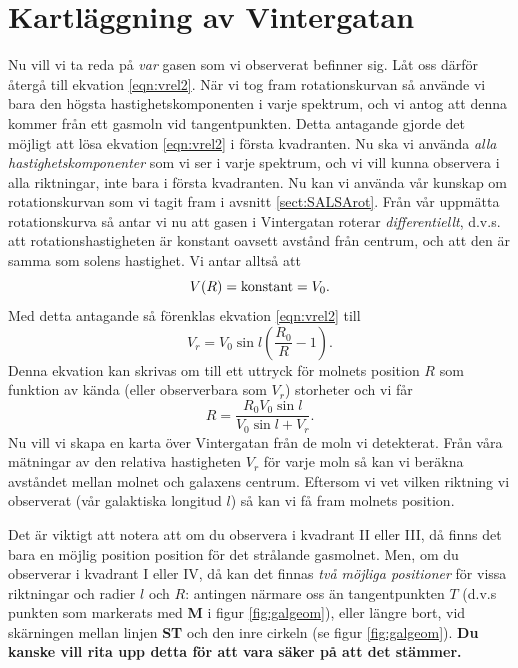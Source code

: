 \section{Kartläggning av Vintergatan}
\label{sect:map}
Nu vill vi ta reda på {\em var} gasen som vi observerat befinner sig.  Låt oss
därför återgå till ekvation \ref{eqn:vrel2}.  När vi tog fram rotationskurvan
så använde vi bara den högsta hastighetskomponenten i varje spektrum, och vi
antog att denna kommer från ett gasmoln vid tangentpunkten.  Detta antagande
gjorde det möjligt att lösa ekvation \ref{eqn:vrel2} i första kvadranten.  Nu
ska vi använda {\em alla hastighetskomponenter} som vi ser i varje spektrum,
och vi vill kunna observera i alla riktningar, inte bara i första kvadranten. 
Nu kan vi använda vår kunskap om rotationskurvan som vi tagit fram i avsnitt \ref{sect:SALSArot}.
Från vår uppmätta rotationskurva så antar vi nu att gasen i Vintergatan 
roterar {\em differentiellt}, d.v.s. att rotationshastigheten är konstant 
oavsett avstånd från centrum, och att den är samma som solens hastighet. Vi 
antar alltså att 
\begin{equation}
	V(R) = {\rm konstant} = V_0.
\end{equation}
Med detta antagande så förenklas ekvation \ref{eqn:vrel2} till 
\begin{equation}
V_r = V_0\sin l \left( \frac{R_0}{R} -1 \right).
\end{equation}
Denna ekvation kan skrivas om till ett uttryck för molnets position $R$ 
som funktion av kända (eller observerbara som $V_r$) storheter och vi får 
\begin{equation}
\boxed{
R = \frac{R_0 V_0 \sin l}{V_0 \sin l + V_r}.
}
\label{eqn:Rmap}
\end{equation}
Nu vill vi skapa en karta över Vintergatan från de moln vi detekterat.
Från våra mätningar av den relativa hastigheten $V_r$ för varje moln
så kan vi beräkna avståndet mellan molnet och galaxens centrum. Eftersom
vi vet vilken riktning vi observerat (vår galaktiska longitud $l$) så 
kan vi få fram molnets position.

Det är viktigt att notera att om du observera i kvadrant II eller III, då finns
det bara en möjlig position position för det strålande gasmolnet.  Men, om du
observerar i kvadrant I eller IV, då kan det finnas {\em två möjliga
positioner} för vissa riktningar och radier $l$ och $R$: antingen närmare oss
än tangentpunkten $T$ (d.v.s punkten som markerats med {\bf M} i figur
\ref{fig:galgeom}), eller längre bort, vid skärningen mellan linjen {\bf ST}
och den inre cirkeln (se figur \ref{fig:galgeom}).  {\bf Du kanske vill rita
upp detta för att vara säker på att det stämmer.}

